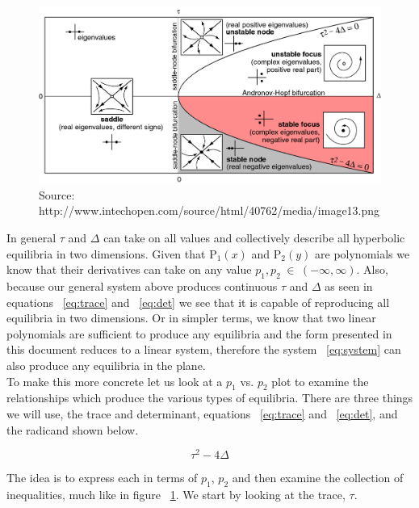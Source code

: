 \documentclass{article}
\begin{document}
\begin{figure}[h]
\centering
\includegraphics[scale=0.37]{figures/tauvsdelta.png}
\caption{Source: http://www.intechopen.com/source/html/40762/media/image13.png}
\label{fig:tauvsdelta}
\end{figure}

In general $\tau$ and $\Delta$ can take on all values and collectively
describe all hyperbolic equilibria in two dimensions. Given that $\text{P}_1(x)$ and
$\text{P}_2(y)$ are polynomials we know that their derivatives can take on any
value $p_1,p_2 \hspace{3pt} \in \hspace{3pt} (-\infty,\infty)$. Also,
because our general system above produces continuous $\tau$ and
$\Delta$ as seen in equations ~\ref{eq:trace} and ~\ref{eq:det}  we see that it is capable of reproducing all equilibria in two
dimensions. Or in simpler terms, we know that two linear polynomials are sufficient to
produce any equilibria and the form presented in this document reduces to a
linear system, therefore the system ~\ref{eq:system} can also produce any
equilibria in the plane. \\

To make this more concrete let us look at a $p_1$ vs. $p_2$ plot to examine the relationships which
produce the various types of equilibria. There are three things we will use, the
trace and determinant, equations ~\ref{eq:trace} and ~\ref{eq:det}, and the radicand shown below.

\begin{equation}
    \tau^2-4\Delta \label{eq:radicand}
\end{equation}

\noindent The idea is to express each in terms of $p_1$, $p_2$ and then
examine the collection of inequalities, much like in figure ~\ref{fig:tauvsdelta}. We start by looking at the trace, $\tau$.
\end{document}
